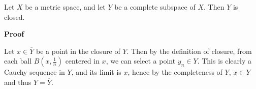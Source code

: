 \documentclass[12pt]{article}
\begin{document}
Let $X$ be a metric space, and let $Y$ be a complete subspace of $X$. Then $Y$ is closed.

{\bf Proof}

Let $x \in \overline Y$ be a point in the closure of $Y$. Then by the definition of closure, from each ball $B(x, \frac 1 n)$ centered in $x$, we can select a point $y_n \in Y$. This is clearly a Cauchy sequence in $Y$, and its limit is $x$, hence by the completeness of $Y$, $x \in Y$ and thus $Y = \overline Y$.
\end{document}
